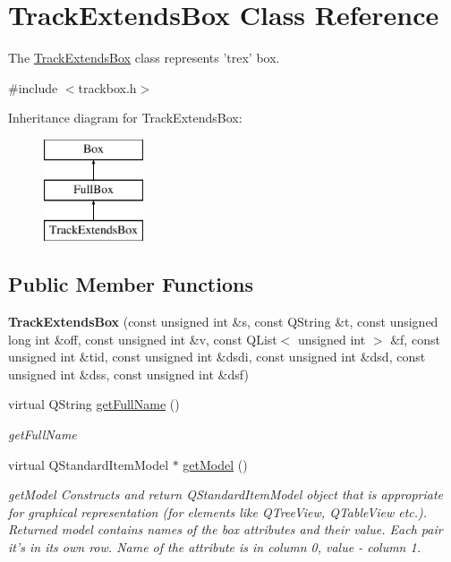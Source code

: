 \hypertarget{class_track_extends_box}{\section{Track\-Extends\-Box Class Reference}
\label{class_track_extends_box}
}


The \hyperlink{class_track_extends_box}{Track\-Extends\-Box} class represents 'trex' box.  




{\ttfamily \#include $<$trackbox.\-h$>$}

Inheritance diagram for Track\-Extends\-Box\-:\begin{figure}[H]
\begin{center}
\leavevmode
\includegraphics[height=3.000000cm]{class_track_extends_box}
\end{center}
\end{figure}
\subsection*{Public Member Functions}
\begin{DoxyCompactItemize}
\item 
\hypertarget{class_track_extends_box_ac1bb5cea8b6cd82aee46e7ae0901d8b7}{{\bfseries Track\-Extends\-Box} (const unsigned int \&s, const Q\-String \&t, const unsigned long int \&off, const unsigned int \&v, const Q\-List$<$ unsigned int $>$ \&f, const unsigned int \&tid, const unsigned int \&dsdi, const unsigned int \&dsd, const unsigned int \&dss, const unsigned int \&dsf)}\label{class_track_extends_box_ac1bb5cea8b6cd82aee46e7ae0901d8b7}

\item 
virtual Q\-String \hyperlink{class_track_extends_box_acaa1a49911d86e5ca02ce2038398ff5d}{get\-Full\-Name} ()
\begin{DoxyCompactList}\small\item\em get\-Full\-Name \end{DoxyCompactList}\item 
virtual Q\-Standard\-Item\-Model $\ast$ \hyperlink{class_track_extends_box_a17e3133ff264960cb23e2431131da088}{get\-Model} ()
\begin{DoxyCompactList}\small\item\em get\-Model Constructs and return Q\-Standard\-Item\-Model object that is appropriate for graphical representation (for elements like Q\-Tree\-View, Q\-Table\-View etc.). Returned model contains names of the box attributes and their value. Each pair it's in its own row. Name of the attribute is in column 0, value -\/ column 1. \end{DoxyCompactList}\end{DoxyCompactItemize}
